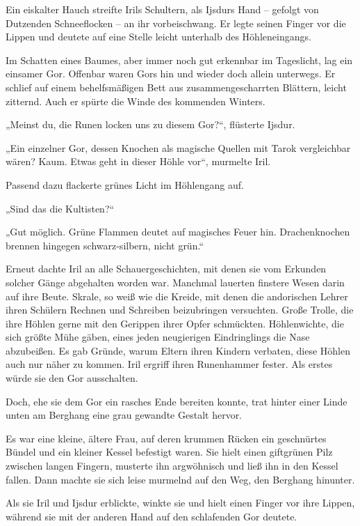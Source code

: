 Ein eiskalter Hauch streifte Irils Schultern, als Ijsdurs Hand – gefolgt von Dutzenden Schneeflocken – an ihr vorbeischwang. Er legte seinen Finger vor die Lippen und deutete auf eine Stelle leicht unterhalb des Höhleneingangs.

Im Schatten eines Baumes, aber immer noch gut erkennbar im Tageslicht, lag ein einsamer Gor. Offenbar waren Gors hin und wieder doch allein unterwegs. Er schlief auf einem behelfsmäßigen Bett aus zusammengescharrten Blättern, leicht zitternd. Auch er spürte die Winde des kommenden Winters.

„Meinst du, die Runen locken uns zu diesem Gor?“, flüsterte Ijsdur.

„Ein einzelner Gor, dessen Knochen als magische Quellen mit Tarok vergleichbar wären? Kaum. Etwas geht in dieser Höhle vor“, murmelte Iril.

Passend dazu flackerte grünes Licht im Höhlengang auf.

„Sind das die Kultisten?“

„Gut möglich. Grüne Flammen deutet auf magisches Feuer hin. Drachenknochen brennen hingegen schwarz-silbern, nicht grün.“

Erneut dachte Iril an alle Schauergeschichten, mit denen sie vom Erkunden solcher Gänge abgehalten worden war. Manchmal lauerten finstere Wesen darin auf ihre Beute. Skrale, so weiß wie die Kreide, mit denen die andorischen Lehrer ihren Schülern Rechnen und Schreiben beizubringen versuchten. Große Trolle, die ihre Höhlen gerne mit den Gerippen ihrer Opfer schmückten. Höhlenwichte, die sich größte Mühe gäben, eines jeden neugierigen Eindringlings die Nase abzubeißen. Es gab Gründe, warum Eltern ihren Kindern verbaten, diese Höhlen auch nur näher zu kommen. Iril ergriff ihren Runenhammer fester. Als erstes würde sie den Gor ausschalten.

Doch, ehe sie dem Gor ein rasches Ende bereiten konnte, trat hinter einer Linde unten am Berghang eine grau gewandte Gestalt hervor.

Es war eine kleine, ältere Frau, auf deren krummen Rücken ein geschnürtes Bündel und ein kleiner Kessel befestigt waren. Sie hielt einen giftgrünen Pilz zwischen langen Fingern, musterte ihn argwöhnisch und ließ ihn in den Kessel fallen. Dann machte sie sich leise murmelnd auf den Weg, den Berghang hinunter.

Als sie Iril und Ijsdur erblickte, winkte sie und hielt einen Finger vor ihre Lippen, während sie mit der anderen Hand auf den schlafenden Gor deutete.

